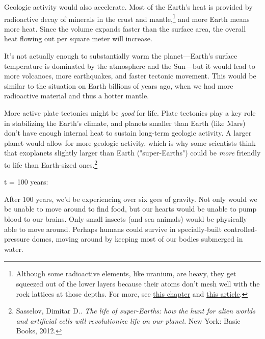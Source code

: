 {{Geologic activity would also accelerate. Most of the Earth's heat is provided by radioactive decay of minerals in the crust and mantle,{\footnote{Although some radioactive elements, like uranium, are heavy, they get squeezed out of the lower layers because their atoms don't mesh well with the rock lattices at those depths. For more, see \href{http://igppweb.ucsd.edu/\~guy/sio103/chap3.pdf}{this chapter} and \href{http://world-nuclear.org/info/Nuclear-Fuel-Cycle/Uranium-Resources/The-Cosmic-Origins-of-Uranium/\#.UlxuGmRDJf4} {this article}.} } and more Earth means more heat. Since the volume expands faster than the surface area, the overall heat flowing out per square meter will increase.}

{It's not actually enough to substantially warm the planet—Earth's surface temperature is dominated by the atmosphere and the Sun—but it would lead to more volcanoes, more earthquakes, and faster tectonic movement. This would be similar to the situation on Earth billions of years ago, when we had more radioactive material and thus a hotter mantle.}

{More active plate tectonics might be \emph{good} for life. Plate tectonics play a key role in stabilizing the Earth's climate, and planets smaller than Earth (like Mars) don't have enough internal heat to sustain long-term geologic activity. A larger planet would allow for more geologic activity, which is why some scientists think that exoplanets slightly larger than Earth ("super-Earths") could be \emph{more} friendly to life than Earth-sized ones.{\footnote{Sasselov, Dimitar D.. \emph{The life of super-Earths: how the hunt for alien worlds and artificial cells will revolutionize life on our planet}. New York: Basic Books, 2012.} } }

{t = 100 years:}

{After 100 years, we'd be experiencing over six gees of gravity. Not only would we be unable to move around to find food, but our hearts would be unable to pump blood to our brains. Only small insects (and sea animals) would be physically able to move around. Perhaps humans could survive in specially-built controlled-pressure domes, moving around by keeping most of our bodies submerged in water.}

}
